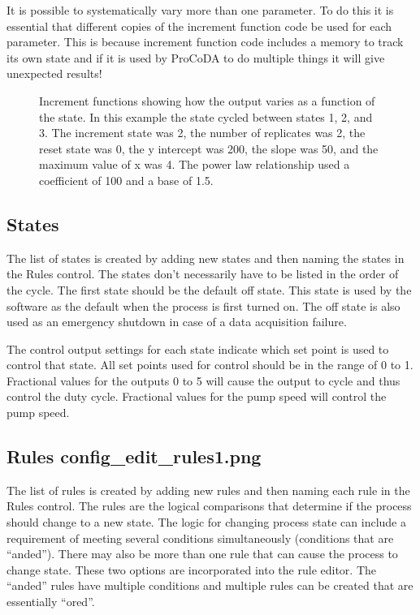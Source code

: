 \documentclass[letterpaper,10pt,english]{sphinxmanual}
\let\sphinxpxdimen\pdfpxdimen\else\newdimen\sphinxpxdimen
\begin{document}
It is possible to systematically vary more than one parameter. To do this it is essential that different copies of the increment function code be used for each parameter. This is because increment function code includes a memory to track its own state and if it is used by ProCoDA to do multiple things it will give unexpected results!

\begin{figure}[htbp]
\centering
\capstart

\noindent\sphinxincludegraphics[width=600\sphinxpxdimen]{{increment_functions}.png}
\caption{Increment functions showing how the output varies as a function of the state. In this example the state cycled between states 1, 2, and 3. The increment state was 2, the number of replicates was 2, the reset state was 0, the y intercept was 200, the slope was 50, and the maximum value of x was 4. The power law relationship used a coefficient of 100 and a base of 1.5.}\label{\detokenize{ProCoDA/ProCoDA:id13}}\label{\detokenize{ProCoDA/ProCoDA:figure-increment-functions}}\end{figure}


\subsection{States}
\label{\detokenize{ProCoDA/ProCoDA:states}}\label{\detokenize{ProCoDA/ProCoDA:heading-procoda-states}}
The list of states is created by adding new states and then naming the states in the Rules control. The states don’t necessarily have to be listed in the order of the cycle. The first state should be the default off state. This state is used by the software as the default when the process is first turned on. The off state is also used as an emergency shutdown in case of a data acquisition failure.

The control output settings for each state indicate which set point is used to control that state. All set points used for control should be in the range of 0 to 1. Fractional values for the outputs 0 to 5 will cause the output to cycle and thus control the duty cycle. Fractional values for the pump speed will control the pump speed.


\subsection[Rules]{Rules \lowercase{\sphinxincludegraphics}{{config_edit_rules1}.png}}
\label{\detokenize{ProCoDA/ProCoDA:rules-config-edit-rules}}\label{\detokenize{ProCoDA/ProCoDA:heading-procoda-rules}}
The list of rules is created by adding new rules and then naming each rule in the Rules control. The rules are the logical comparisons that determine if the process should change to a new state. The logic for changing process state can include a requirement of meeting several conditions simultaneously (conditions that are “anded”). There may also be more than one rule that can cause the process to change state. These two options are incorporated into the rule editor. The “anded” rules have multiple conditions and multiple rules can be created that are essentially “ored”.
\end{document}
